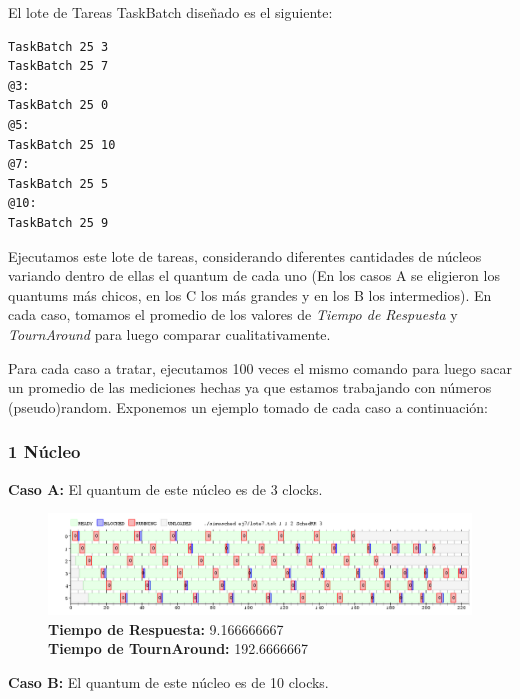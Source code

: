 \documentclass[a4paper]{article}
\begin{document}
El lote de Tareas TaskBatch dise\~nado es el siguiente:
	\begin{codesnippet}
	\begin{verbatim}
TaskBatch 25 3
TaskBatch 25 7
@3:
TaskBatch 25 0
@5:
TaskBatch 25 10
@7:
TaskBatch 25 5
@10:
TaskBatch 25 9
	\end{verbatim}
	\end{codesnippet}

	Ejecutamos este lote de tareas, considerando diferentes cantidades de n\'ucleos variando dentro de ellas el quantum de cada uno (En los casos A se eligieron los quantums m\'as chicos, en los C los m\'as grandes y en los B los intermedios). En cada caso, tomamos el promedio de los valores de \textit{Tiempo de Respuesta} y \textit{TournAround} para luego comparar cualitativamente.
	
	Para cada caso a tratar, ejecutamos 100 veces el mismo comando para luego sacar un promedio de las mediciones hechas ya que estamos trabajando con n\'umeros (pseudo)random. Exponemos un ejemplo tomado de cada caso a continuaci\'on:
	
	\subsubsection*{1 N\'ucleo}
	
	\textbf{Caso A:} El quantum de este n\'ucleo es de 3 clocks.
	
	 \begin{figure}[h!]
   \begin{center}
 	\includegraphics[scale=0.5]{imagenes/ej7/1nucleoA.png}
 	\textbf{Tiempo de Respuesta:} 9.166666667\\
 	\textbf{Tiempo de TournAround:} 192.6666667\\
   \end{center}
 \end{figure} 
	
	
	\textbf{Caso B:} El quantum de este n\'ucleo es de 10 clocks.
	
\end{document}
